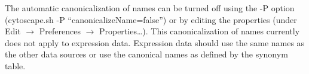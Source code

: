  The automatic canonicalization of names can be turned off using the -P option
(cytoscape.sh -P ``canonicalizeName=false'') or by editing the properties (under
Edit $\rightarrow$ Preferences $\rightarrow$ Properties\ldots). This canonicalization
of names currently does not apply to expression data. Expression data should
use the same names as the other data sources or use the canonical names as
defined by the synonym table. 
